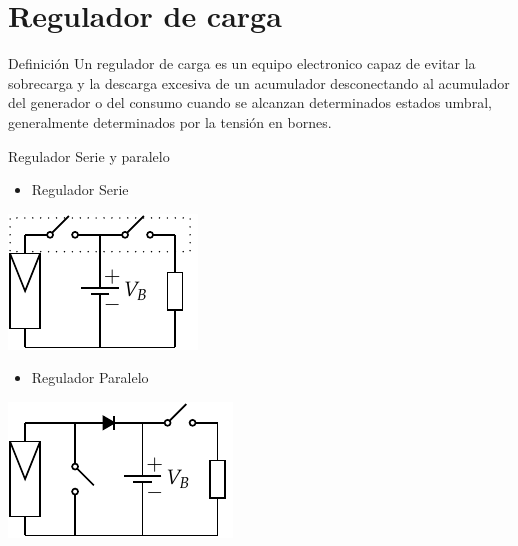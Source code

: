 \documentclass[xcolor={usenames,svgnames,dvipsnames}]{beamer}
\begin{document}
\section{Regulador de carga}
\label{sec-3}

\begin{frame}[label=sec-3-0-1]{Definición}
Un regulador de carga es un equipo electronico capaz de \alert{evitar la sobrecarga y la descarga excesiva de un acumulador} desconectando al acumulador del generador o del consumo \alert{cuando se alcanzan determinados estados umbral, generalmente determinados por la tensión en bornes}.
\end{frame}

\begin{frame}[label=sec-3-0-2]{Regulador Serie y paralelo}
\begin{itemize}
\item Regulador Serie
\end{itemize}
\includegraphics[height=0.3\textheight]{../figs/ReguladorSerie.pdf}

\begin{itemize}
\item Regulador Paralelo
\end{itemize}
\includegraphics[height=0.3\textheight]{../figs/ReguladorParalelo.pdf}
\end{frame}
\end{document}
